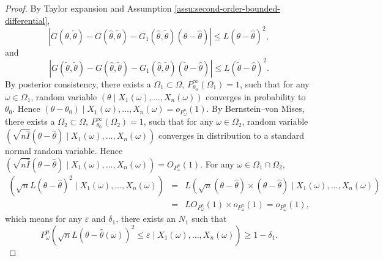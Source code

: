 \begin{proof}
By Taylor expansion and Assumption \ref{assu:second-order-bounded-differential},
\begin{equation}
\left|G\left(\theta,\tilde{\theta}\right)-G\left(\hat{\theta},\tilde{\theta}\right)-G_{1}\left(\hat{\theta},\tilde{\theta}\right)\left(\theta-\hat{\theta}\right)\right|\le L\left(\theta-\hat{\theta}\right)^{2},\label{eq:second-lip-1}
\end{equation}
and 
\begin{equation}
\left|G\left(\tilde{\theta},\tilde{\theta}\right)-G\left(\hat{\theta},\tilde{\theta}\right)-G_{1}\left(\hat{\theta},\tilde{\theta}\right)\left(\tilde{\theta}-\hat{\theta}\right)\right|\le L\left(\tilde{\theta}-\hat{\theta}\right)^{2}.\label{eq:second-lip-2}
\end{equation}
By posterior consistency, there exists a $\Omega_{1}\subset\Omega$,
$P_{\theta_{0}}^{\infty}\left(\Omega_{1}\right)=1$, such that for
any $\omega\in\Omega_{1}$, random variable $\left(\theta\mid X_{1}\left(\omega\right),\ldots,X_{n}\left(\omega\right)\right)$
converges in probability to $\theta_{0}$. Hence $\left(\theta-\theta_{0}\right)\mid X_{1}\left(\omega\right),\ldots,X_{n}\left(\omega\right)=o_{P_{\omega}^{n}}\left(1\right)$.
By Bernstein--von Mises, there exists a $\Omega_{2}\subset\Omega$,
$P_{\theta_{0}}^{\infty}\left(\Omega_{2}\right)=1$, such that for
any $\omega\in\Omega_{2}$, random variable $\left(\sqrt{n\hat{I}}\left(\theta-\hat{\theta}\right)\mid X_{1}\left(\omega\right),\ldots,X_{n}\left(\omega\right)\right)$
converges in distribution to a standard normal random variable. Hence
$\left(\sqrt{n\hat{I}}\left(\theta-\hat{\theta}\right)\mid X_{1}\left(\omega\right),\ldots,X_{n}\left(\omega\right)\right)=O_{P_{\omega}^{n}}\left(1\right).$
For any $\omega\in\Omega_{1}\cap\Omega_{2}$, 
\begin{eqnarray*}
\left(\sqrt{n}L\left(\theta-\hat{\theta}\right)^{2}\mid X_{1}\left(\omega\right),\ldots,X_{n}\left(\omega\right)\right) & = & L\left(\sqrt{n}\left(\theta-\hat{\theta}\right)\times\left(\theta-\hat{\theta}\right)\mid X_{1}\left(\omega\right),\ldots,X_{n}\left(\omega\right)\right)\\
 & = & LO_{P_{\omega}^{n}}\left(1\right)\times o_{P_{\omega}^{n}}\left(1\right)=o_{P_{\omega}^{n}}\left(1\right),
\end{eqnarray*}
which means for any $\varepsilon$ and $\delta_{1}$, there exists
an $N_{1}$ such that 
\[
P_{\omega}^{n}\left(\sqrt{n}L\left(\theta-\hat{\theta}\left(\omega\right)\right)^{2}\le\varepsilon\mid X_{1}\left(\omega\right),\ldots,X_{n}\left(\omega\right)\right)\ge1-\delta_{1}.
\]
\end{proof}
